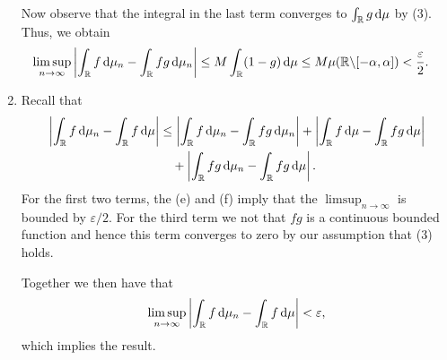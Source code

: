 \begin{enumerate}[label={(\alph*)}]
Now observe that the integral in the last term converges to $\int_{\mathbb R} g \, \mathrm{d} \mu$ by (3). Thus, we obtain
\begin{align*}
	\limsup_{n \to \infty} \left|\int_{\mathbb R} f \, \mathrm{d} \mu_n - \int_{\mathbb R} fg \, \mathrm{d} \mu_n\right|
	&\le M \int_{\mathbb R} (1-g) \, \mathrm{d} \mu \le M \mu(\mathbb R \backslash [-\alpha,\alpha]) < \frac{\varepsilon}{2}.
\end{align*}
\item 
Recall that
\begin{align*}
	\left|\int_{\mathbb R} f \, \mathrm{d} \mu_n - \int_{\mathbb R} f \, \mathrm{d} \mu\right| &\le \left|\int_{\mathbb R} f \, \mathrm{d} \mu_n - \int_{\mathbb R} fg \, \mathrm{d} \mu_n\right| + \left|\int_{\mathbb R} f \, \mathrm{d} \mu - \int_{\mathbb R} fg \, \mathrm{d} \mu\right|\\ &\hspace{10pt}+ \left|\int_{\mathbb R} fg \, \mathrm{d} \mu_n - \int_{\mathbb R} fg \, \mathrm{d} \mu\right|.
\end{align*}
For the first two terms, the (e) and (f) imply that the $\limsup_{n \to \infty}$ is bounded by $\varepsilon/2$. For the third term we not that $fg$ is a continuous bounded function and hence this term converges to zero by our assumption that (3) holds.

Together we then have that
\[
	\limsup_{n \to \infty} \left|\int_{\mathbb R} f \, \mathrm{d} \mu_n - \int_{\mathbb R} f \, \mathrm{d} \mu\right| < \varepsilon,
\]
which implies the result.
\end{enumerate}